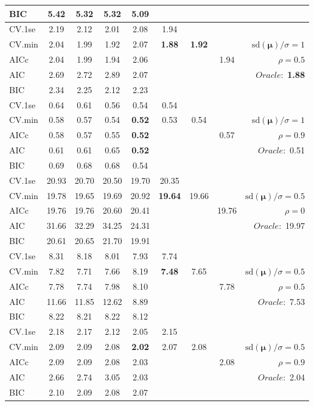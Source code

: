 \begin{table}
\begin{center}
\begin{tabular}{l*{7}{c}|r}
BIC & 5.42 & 5.32 & 5.32 & 5.09 & & & &  \\
 \hline 
CV.1se & 2.19 & 2.12 & 2.01 & 2.08 & 1.94 & & & \\
CV.min & 2.04 & 1.99 & 1.92 & 2.07 & {\bf 1.88} & {\bf 1.92} & & $\mathrm{sd}(\mathbf{\mu})/\sigma=1$ \\
AICc & 2.04 & 1.99 & 1.94 & 2.06 & & & 1.94 &  $\rho=0.5$ \\
AIC & 2.69 & 2.72 & 2.89 & 2.07 & & & &  \multirow{2}{*}{$Oracle: $ {\bf 1.88}} \\
BIC & 2.34 & 2.25 & 2.12 & 2.23 & & & &  \\
 \hline 
CV.1se & 0.64 & 0.61 & 0.56 & 0.54 & 0.54 & & & \\
CV.min & 0.58 & 0.57 & 0.54 & {\bf 0.52} & 0.53 & 0.54 & & $\mathrm{sd}(\mathbf{\mu})/\sigma=1$ \\
AICc & 0.58 & 0.57 & 0.55 & {\bf 0.52} & & & 0.57 &  $\rho=0.9$ \\
AIC & 0.61 & 0.61 & 0.65 & {\bf 0.52} & & & &  \multirow{2}{*}{$Oracle: $ 0.51} \\
BIC & 0.69 & 0.68 & 0.68 & 0.54 & & & &  \\
 \hline 
CV.1se & 20.93 & 20.70 & 20.50 & 19.70 & 20.35 & & & \\
CV.min & 19.78 & 19.65 & 19.69 & 20.92 & {\bf 19.64} & 19.66 & & $\mathrm{sd}(\mathbf{\mu})/\sigma=0.5$ \\
AICc & 19.76 & 19.76 & 20.60 & 20.41 & & & 19.76 &  $\rho=0$ \\
AIC & 31.66 & 32.29 & 34.25 & 24.31 & & & &  \multirow{2}{*}{$Oracle: $ 19.97} \\
BIC & 20.61 & 20.65 & 21.70 & 19.91 & & & &  \\
 \hline 
CV.1se & 8.31 & 8.18 & 8.01 & 7.93 & 7.74 & & & \\
CV.min & 7.82 & 7.71 & 7.66 & 8.19 & {\bf 7.48} & 7.65 & & $\mathrm{sd}(\mathbf{\mu})/\sigma=0.5$ \\
AICc & 7.78 & 7.74 & 7.98 & 8.10 & & & 7.78 &  $\rho=0.5$ \\
AIC & 11.66 & 11.85 & 12.62 & 8.89 & & & &  \multirow{2}{*}{$Oracle: $ 7.53} \\
BIC & 8.22 & 8.21 & 8.22 & 8.12 & & & &  \\
 \hline 
CV.1se & 2.18 & 2.17 & 2.12 & 2.05 & 2.15 & & & \\
CV.min & 2.09 & 2.09 & 2.08 & {\bf 2.02} & 2.07 & 2.08 & & $\mathrm{sd}(\mathbf{\mu})/\sigma=0.5$ \\
AICc & 2.09 & 2.09 & 2.08 & 2.03 & & & 2.08 &  $\rho=0.9$ \\
AIC & 2.66 & 2.74 & 3.05 & 2.03 & & & &  \multirow{2}{*}{$Oracle: $ 2.04} \\
BIC & 2.10 & 2.09 & 2.08 & 2.07 & & & &  \\
 \hline 
\end{tabular}
\end{center}
\vspace{-1cm}
\end{table}




